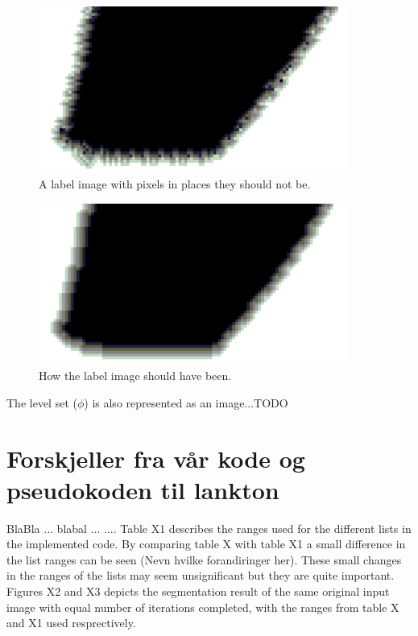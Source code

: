 \begin{figure}[h!]
\centering
\includegraphics[width=0.90\textwidth]{sparseFieldCode/labelFailedEx}
\caption{A label image with pixels in places they should not be.}
\label{labelFailedEx}
\end{figure}


\begin{figure}[h!]
\centering
\includegraphics[width=0.90\textwidth]{sparseFieldCode/labelOkEx}
\caption{How the label image should have been.}
\label{labelOkEx}
\end{figure}

The level set ($\phi$) is also represented as an image...TODO



\section{Forskjeller fra vår kode og pseudokoden til lankton}
BlaBla ...   blabal ... .... Table X1 describes the ranges used for the different lists in the implemented code. By comparing table X with table X1 a small difference in the list ranges can be seen (Nevn hvilke forandiringer her). These small changes in the ranges of the lists may seem unsignificant but they are quite important. Figures X2 and X3 depicts the segmentation result of the same original input image with equal number of iterations completed, with the ranges from table X and X1 used resprectively.

